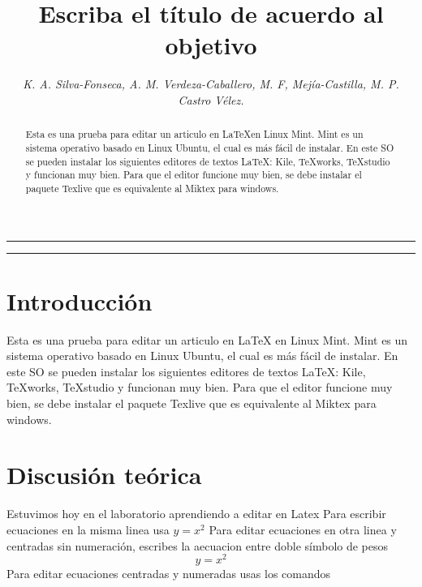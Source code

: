 \documentclass[12]{article}
\title{\huge{\textbf{Escriba el t\'itulo de acuerdo al objetivo}}}%
\author{\small \textit{{K. A. Silva-Fonseca, A. M. Verdeza-Caballero, M. F, Mej\'ia-Castilla, M. P. Castro V\'elez.}}}%
\begin{document}
\maketitle

\begin{center}
\rule[0mm]{150mm}{0.1mm}%
\end{center}


\begin{abstract}
\noindent %
Esta es una prueba para editar un articulo en \LaTeX en Linux Mint. Mint es un sistema operativo basado en Linux Ubuntu, el cual es m\'as f\'acil de instalar. En este SO se pueden instalar los siguientes editores de textos \LaTeX: Kile, TeXworks, TeXstudio y funcionan muy bien. Para que el editor funcione muy bien, se debe instalar el paquete Texlive que es equivalente al Miktex para windows.\end{abstract}

\begin{center}
 \rule[0mm]{150mm}{0.1mm}%
\end{center}



\section{Introducci\'on}

Esta es una prueba para editar un articulo en LaTeX en Linux Mint. Mint es un sistema operativo basado en Linux Ubuntu, el cual es m\'as f\'acil de instalar. En este SO se pueden  instalar los siguientes editores de textos LaTeX: Kile, TeXworks, TeXstudio y funcionan muy bien. Para que el editor funcione muy bien, se debe instalar el paquete Texlive que es equivalente al Miktex para windows.

\section{Discusi\'on te\'orica}

Estuvimos hoy en el laboratorio aprendiendo a editar en Latex
\noindent
Para escribir ecuaciones en la misma linea usa $ y = x^{2}$
\noindent
Para editar ecuaciones en otra linea y centradas sin numeraci\'on, escribes la aecuacion entre doble s\'imbolo de pesos
$$ y = x^{2}$$
\noindent
Para editar ecuaciones centradas y numeradas usas los comandos
\end{document}
